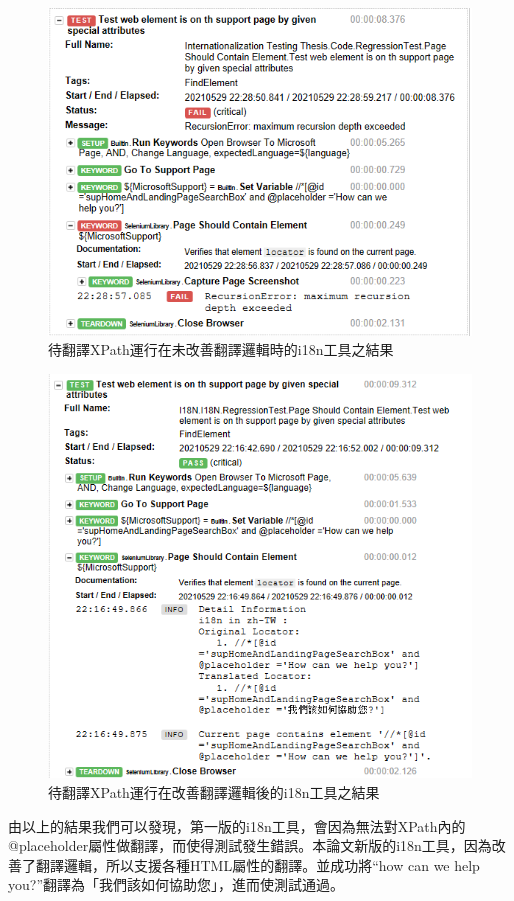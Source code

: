 \begin{figure}[H]
\centering
\includegraphics[width= .8\textwidth]{../論文截圖/4-2-3 @placeholder運行在第一版i18n.png}
\caption{待翻譯XPath運行在未改善翻譯邏輯時的i18n工具之結果}
\end{figure}

\begin{figure}[H]
\centering
\includegraphics[width= \textwidth]{../論文截圖/4-2-4 @placeholder運行在當前i18n版本.png}
\caption{待翻譯XPath運行在改善翻譯邏輯後的i18n工具之結果}
\end{figure}

由以上的結果我們可以發現，第一版的i18n工具，會因為無法對XPath內的@placeholder屬性做翻譯，而使得測試發生錯誤。本論文新版的i18n工具，因為改善了翻譯邏輯，所以支援各種HTML屬性的翻譯。並成功將“how can we help you?”翻譯為「我們該如何協助您」，進而使測試通過。

